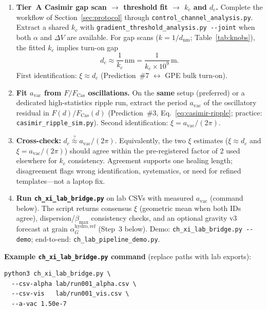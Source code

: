 \documentclass[11pt,a4paper]{article}
\newcommand{\py}[1]{\nolinkurl{#1}}
\begin{document}
\begin{enumerate}[label=\textbf{\arabic*.}, leftmargin=*]
  \item \textbf{Tier~A Casimir gap scan $\to$ threshold fit $\to$ $k_c$ and $d_c$.}
  Complete the workflow of Section~\ref{sec:protocol} through \py{control_channel_analysis.py}.
  Extract a shared $k_c$ with \py{gradient_threshold_analysis.py --joint} when both $\alpha$ and $\Delta V$ are available.
  For gap scans ($k = 1/d_{\mathrm{nm}}$; Table~\ref{tab:knobs}), the fitted $k_c$ implies turn-on gap
  \begin{equation}
    d_c \approx \frac{1}{k_c}\,\mathrm{nm} = \frac{1}{k_c \times 10^9}\,\mathrm{m}.
    \label{eq:dc-from-kc}
  \end{equation}
  First identification: $\xi \approx d_c$ (Prediction~\#7 $\leftrightarrow$ GPE bulk turn-on).

  \item \textbf{Fit $a_{\mathrm{vac}}$ from $F/F_{\mathrm{Cas}}$ oscillations.}
  On the \textbf{same} setup (preferred) or a dedicated high-statistics ripple run, extract the period $a_{\mathrm{vac}}$ of the oscillatory residual in $F(d)/F_{\mathrm{Cas}}(d)$ (Prediction~\#3, Eq.~\ref{eq:casimir-ripple}; practice: \texttt{casimir\_ripple\_sim.py}).
  Second identification: $\xi = a_{\mathrm{vac}}/(2\pi)$.

  \item \textbf{Cross-check:} $d_c \stackrel{?}{\approx} a_{\mathrm{vac}}/(2\pi)$.
  Equivalently, the two $\xi$ estimates ($\xi \approx d_c$ and $\xi = a_{\mathrm{vac}}/(2\pi)$) should agree within the pre-registered factor of 2 used elsewhere for $k_c$ consistency.
  Agreement supports one healing length; disagreement flags wrong identification, systematics, or need for refined templates---not a laptop fix.

  \item \textbf{Run \py{ch_xi_lab_bridge.py}} on lab CSVs with measured $a_{\mathrm{vac}}$ (command below).
  The script returns consensus $\xi$ (geometric mean when both IDs agree), dispersion/$\beta_{\max}$ consistency checks, and an optional gravity v3 forecast at grain $\alpha_G^{\mathrm{hydro,ref}}$ (Step~3 below).
  Demo: \py{ch_xi_lab_bridge.py --demo}; end-to-end: \py{ch_lab_pipeline_demo.py}.
\end{enumerate}

\noindent\textbf{Example \py{ch_xi_lab_bridge.py} command} (replace paths with lab exports):
\begin{verbatim}
python3 ch_xi_lab_bridge.py \
  --csv-alpha lab/run001_alpha.csv \
  --csv-vis   lab/run001_vis.csv \
  --a-vac 1.50e-7
\end{verbatim}
\end{document}
